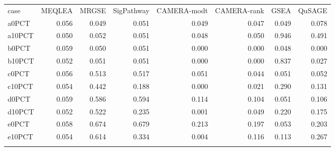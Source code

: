 \documentclass[a4,center,fleqn]{NAR}
\newcommand{\OurMethod}{MEQLEA}
\newcommand{\CMR}{CAMERA-rank}
\newcommand{\CMT}{CAMERA-modt}
\newcommand{\gent}{SigPathway}
\newcommand{\genr}{MRGSE}
\begin{document}
		\begin{table}[ht]
			\centering
			\begin{tabular}{lrrrrrrr}
				\toprule
				case & \OurMethod & \genr & \gent & \CMT & \CMR & GSEA & QuSAGE \\ 
				\colrule
				a0PCT & 0.056 & 0.049 & 0.051 & 0.049 & 0.047 & 0.049 & 0.078 \\ 
				a10PCT & 0.050 & 0.052 & 0.051 & 0.048 & 0.050 & 0.946 & 0.491 \\ 
				b0PCT & 0.059 & 0.050 & 0.051 & 0.000 & 0.000 & 0.048 & 0.000 \\ 
				b10PCT & 0.052 & 0.051 & 0.051 & 0.000 & 0.000 & 0.837 & 0.027 \\ 
				c0PCT & 0.056 & 0.513 & 0.517 & 0.051 & 0.044 & 0.051 & 0.052 \\ 
				c10PCT & 0.054 & 0.442 & 0.188 & 0.000 & 0.021 & 0.290 & 0.131 \\ 
				d0PCT & 0.059 & 0.586 & 0.594 & 0.114 & 0.104 & 0.051 & 0.106 \\ 
				d10PCT & 0.052 & 0.522 & 0.235 & 0.001 & 0.049 & 0.220 & 0.175 \\ 
				e0PCT & 0.058 & 0.674 & 0.679 & 0.213 & 0.197 & 0.053 & 0.203 \\ 
				e10PCT & 0.054 & 0.614 & 0.334 & 0.004 & 0.116 & 0.113 & 0.267 \\ 
				\botrule
			\end{tabular}
		\end{table}
		
	
	\newpage
%	
	
	
	
	

	
	
\end{document}
